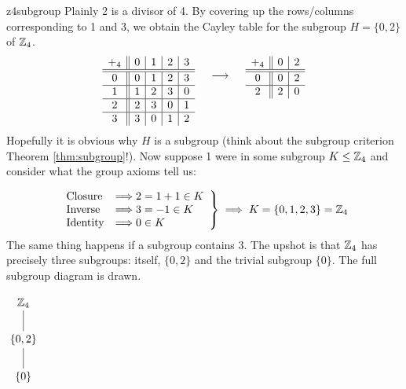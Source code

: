 \begin{example}{}{z4subgroup}
	Plainly 2 is a divisor of 4. By covering up the rows/columns corresponding to 1 and 3, we obtain the  Cayley table for the subgroup $H=\{0,2\}$ of $\mathbb{Z}_4$. 
	\[
		\begin{array}[t]{c||c|c|c|c}
			+_4 & 0 & 1 & 2 & 3\\\hline\hline
			0 & 0 & 1 & 2 & 3\\\hline
			1 & 1 & 2 & 3 & 0\\\hline
			2 & 2 & 3 & 0 & 1\\\hline
			3 & 3 & 0 & 1 & 2
		\end{array}
		\quad
		\begin{array}[t]{c}
			\\
			\longrightarrow
		\end{array}
		\quad
		\begin{array}[t]{c||c|c}
			+_4 & 0 & 2\\\hline\hline
			0 & 0 & 2\\\hline
			2 & 2 & 0
		\end{array}
	\]
	Hopefully it is obvious why $H$ is a subgroup (think about the subgroup criterion Theorem \ref{thm:subgroup}!). Now suppose 1 were in some subgroup $K\le \mathbb{Z}_4$ and consider what the group axioms tell us:
	\begin{minipage}[t]{0.9\linewidth}\vspace{-6pt}
		\[
			\left.
			\begin{array}{ll}
				\text{Closure}&\Longrightarrow 2=1+1\in K\\
		  	\text{Inverse}&\Longrightarrow 3=-1\in K\\
		  	\text{Identity}&\Longrightarrow 0\in K
			\end{array}
			\right\}
			\implies K=\{0,1,2,3\}=\mathbb{Z}_4
		\]
		The same thing happens if a subgroup contains 3. The upshot is that $\mathbb{Z}_4$ has precisely three subgroups: itself, $\{0,2\}$ and the trivial subgroup $\{0\}$. The full subgroup diagram is drawn.
	\end{minipage}
	\hfill
	\begin{minipage}[t]{0.09\linewidth}\vspace{-5pt}
		\flushright$\xymatrix @R18pt{\Z_4 \ar@{-}[d]\\ \{0,2\} \ar@{-}[d]\\ \{0\}}$
	\end{minipage}
\end{example}

